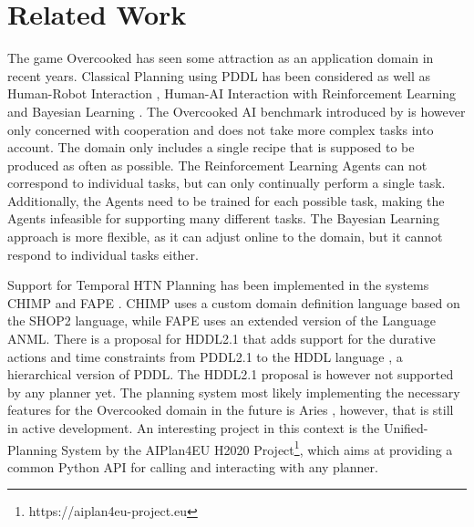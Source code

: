 \section{Related Work}

The game Overcooked has seen some attraction as an application domain in recent years.
Classical Planning using PDDL has been considered \citep{yuxinliuPlanningOvercookedGame2020} as well as Human-Robot Interaction \citep{bishopCHAOPTTestbedEvaluating2020,roseroTwoManyCooks2021}, Human-AI Interaction with Reinforcement Learning \citep{carrollUtilityLearningHumans2019,charakornInvestigatingPartnerDiversification2020,knottEvaluatingRobustnessCollaborative2021,nalepkaInteractionFlexibilityArtificial2021,fontaineImportanceEnvironmentsHumanRobot2021,zhaoMaximumEntropyPopulationbased2023,sarkarPantheonrlMarlLibrary2022,ruhdorferMindsChefsUsing2023} and Bayesian Learning \citep{ribeiroAssistingUnknownTeammates2022}.
The Overcooked AI benchmark introduced by \cite{carrollUtilityLearningHumans2019} is however only concerned with cooperation and does not take more complex tasks into account.
The domain only includes a single recipe that is supposed to be produced as often as possible.
The Reinforcement Learning Agents can not correspond to individual tasks, but can only continually perform a single task.
Additionally, the Agents need to be trained for each possible task, making the Agents infeasible for supporting many different tasks.
The Bayesian Learning approach is more flexible, as it can adjust online to the domain, but it cannot respond to individual tasks either.

Support for Temporal HTN Planning has been implemented in the systems CHIMP \citep{stockHierarchicalHybridPlanning2017} and FAPE \citep{bit-monnotFAPEConstraintbasedPlanner2020}.
CHIMP uses a custom domain definition language based on the SHOP2 language, while FAPE uses an extended version of the Language ANML.
There is a proposal for HDDL2.1 \citep{pellierHDDLDefiningFormalism2023} that adds support for the durative actions and time constraints from PDDL2.1 \citep{foxPDDL2ExtensionPDDL2003} to the HDDL language \citep{hollerHDDLExtensionPDDL2020}, a hierarchical version of PDDL.
The HDDL2.1 proposal is however not supported by any planner yet.
The planning system most likely implementing the necessary features for the Overcooked domain in the future is Aries \citep{bit-monnotAries2024}, however, that is still in active development.
An interesting project in this context is the Unified-Planning System \citep{frambaUnifiedPlanning2024} by the AIPlan4EU H2020 Project\footnote{https://aiplan4eu-project.eu}, which aims at providing a common Python API for calling and interacting with any planner.

